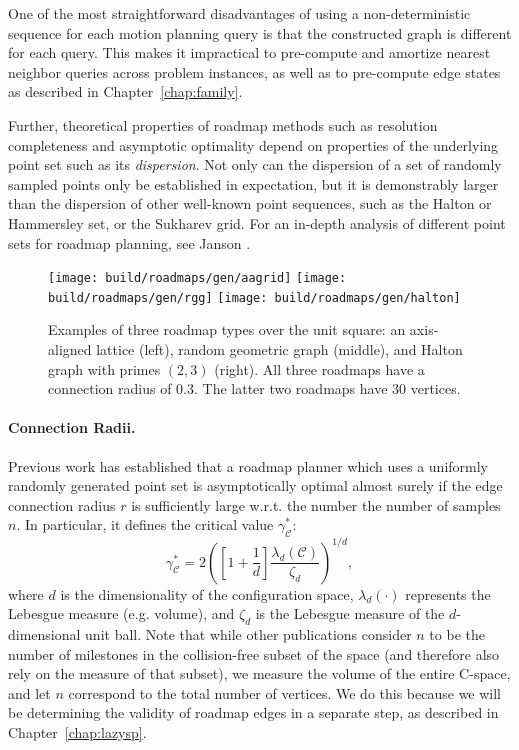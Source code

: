 One of the most straightforward disadvantages of using a
non-deterministic sequence for each motion planning query
is that the constructed graph is different for each query.
This makes it impractical to pre-compute and amortize nearest
neighbor queries across problem instances,
as well as to pre-compute edge states as described in
Chapter~\ref{chap:family}.

Further,
theoretical properties of roadmap methods
such as resolution completeness and asymptotic optimality
depend on properties of the underlying point set
such as its \emph{dispersion}.
Not only can the dispersion of a set of randomly sampled points
only be established in expectation,
but it is demonstrably larger than the dispersion of other
well-known point sequences,
such as the Halton or Hammersley set,
or the Sukharev grid.
For an in-depth analysis of different point sets for roadmap
planning, see Janson \citep{janson2015deterministicsampling}.

\begin{figure}
   \centering
   \texttt{[image: build/roadmaps/gen/aagrid]}
   \;
   \texttt{[image: build/roadmaps/gen/rgg]}
   \;
   \texttt{[image: build/roadmaps/gen/halton]}
   \caption{Examples of three roadmap types over the unit square:
      an axis-aligned lattice (left),
      random geometric graph (middle),
      and Halton graph with primes $(2,3)$ (right).
      All three roadmaps have a connection radius of 0.3.
      The latter two roadmaps have 30 vertices.}
\end{figure}

\paragraph{Connection Radii.}
Previous work \citep{karaman2011samplingoptimal} has established
that a roadmap planner which uses a uniformly randomly generated
point set is asymptotically optimal almost surely
if the edge connection radius $r$ is sufficiently large w.r.t.
the number the number of samples $n$.
In particular,
it defines the critical value $\gamma^*_{\mathcal{C}}$:
\begin{equation}
   \gamma^*_{\mathcal{C}}
      = 2 \left( \left[ 1 + \frac{1}{d} \right]
         \frac{\lambda_d(\mathcal{C})}{\zeta_d} \right)^{1/d},
\end{equation}
where $d$ is the dimensionality of the configuration space,
$\lambda_d(\cdot)$ represents the Lebesgue measure (e.g. volume),
and $\zeta_d$ is the Lebesgue measure of the $d$-dimensional unit ball.
Note that while other publications consider $n$ to be the number
of milestones in the collision-free subset of the space
(and therefore also rely on the measure of that subset),
we measure the volume of the entire C-space,
and let $n$ correspond to the total number of vertices.
We do this because we will be determining the validity of roadmap edges
in a separate step,
as described in Chapter~\ref{chap:lazysp}.


